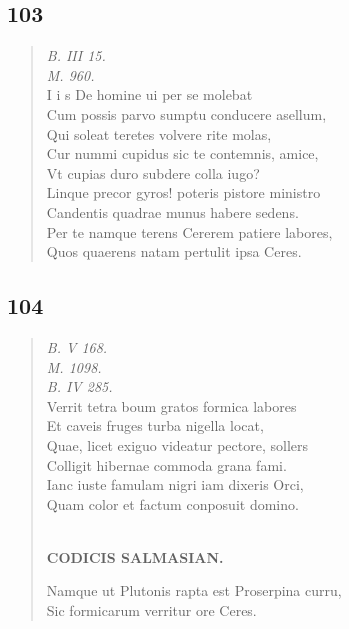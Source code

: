 \documentclass[11pt, a4paper]{report}
\begin{document}
            \subsection*{103}
      \begin{verse}
      \textit{B. III 15.} \\ \textit{M. 960.} \\ I i s De homine ui per se molebat \\ Cum possis parvo sumptu conducere asellum, \\ Qui soleat teretes volvere rite molas, \\ Cur nummi cupidus sic te contemnis, amice, \\ Vt cupias duro subdere colla iugo? \\ Linque precor gyros! poteris pistore ministro \\ Candentis quadrae munus habere sedens. \\ Per te namque terens Cererem patiere labores, \\ Quos quaerens natam pertulit ipsa Ceres. \\ 
      \end{verse}
  
            \subsection*{104}
      \begin{verse}
      \textit{B. V 168.} \\ \textit{M. 1098.} \\ \textit{B. IV 285.} \\ Verrit tetra boum gratos formica labores \\ Et caveis fruges turba nigella locat, \\ Quae, licet exiguo videatur pectore, sollers \\ Colligit hibernae commoda grana fami. \\ Ianc iuste famulam nigri iam dixeris Orci, \\ Quam color et factum conposuit domino. \\ 
        ﻿\pagebreak 
    \begin{center} \textbf{CODICIS SALMASIAN.} \end{center} \marginpar{[127]} Namque ut Plutonis rapta est Proserpina curru, \\ Sic formicarum verritur ore Ceres. \\ 
      \end{verse}
  
\end{document}
